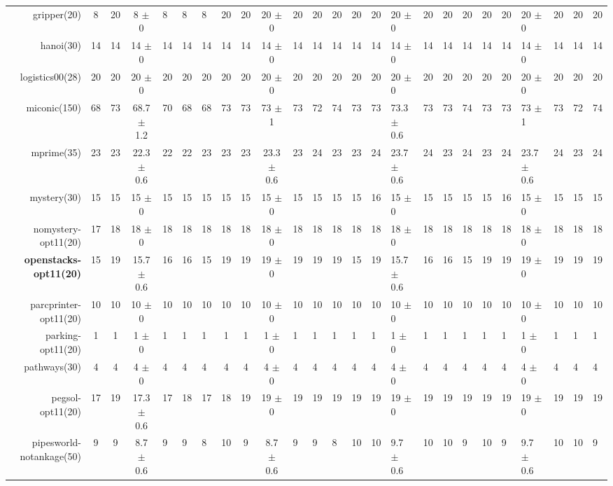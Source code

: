 \begin{center}
\begin{tabular}{|r|cccHHH|cccHHHHHHHHHHHHHHH|}
gripper(20) & 8 & 20 & 8 $\pm$ 0 & 8 & 8 & 8 & 20 & 20 & 20 $\pm$ 0 & 20 & 20 & 20 & 20 & 20 & 20 $\pm$ 0 & 20 & 20 & 20 & 20 & 20 & 20 $\pm$ 0 & 20 & 20 & 20\\
hanoi(30) & 14 & 14 & 14 $\pm$ 0 & 14 & 14 & 14 & 14 & 14 & 14 $\pm$ 0 & 14 & 14 & 14 & 14 & 14 & 14 $\pm$ 0 & 14 & 14 & 14 & 14 & 14 & 14 $\pm$ 0 & 14 & 14 & 14\\
logistics00(28) & 20 & 20 & 20 $\pm$ 0 & 20 & 20 & 20 & 20 & 20 & 20 $\pm$ 0 & 20 & 20 & 20 & 20 & 20 & 20 $\pm$ 0 & 20 & 20 & 20 & 20 & 20 & 20 $\pm$ 0 & 20 & 20 & 20\\
miconic(150) & 68 & 73 & 68.7 $\pm$ 1.2 & 70 & 68 & 68 & 73 & 73 & 73 $\pm$ 1 & 73 & 72 & 74 & 73 & 73 & 73.3 $\pm$ 0.6 & 73 & 73 & 74 & 73 & 73 & 73 $\pm$ 1 & 73 & 72 & 74\\
mprime(35) & 23 & 23 & 22.3 $\pm$ 0.6 & 22 & 22 & 23 & 23 & 23 & 23.3 $\pm$ 0.6 & 23 & 24 & 23 & 23 & 24 & 23.7 $\pm$ 0.6 & 24 & 23 & 24 & 23 & 24 & 23.7 $\pm$ 0.6 & 24 & 23 & 24\\
mystery(30) & 15 & 15 & 15 $\pm$ 0 & 15 & 15 & 15 & 15 & 15 & 15 $\pm$ 0 & 15 & 15 & 15 & 15 & 16 & 15 $\pm$ 0 & 15 & 15 & 15 & 15 & 16 & 15 $\pm$ 0 & 15 & 15 & 15\\
nomystery-opt11(20) & 17 & 18 & 18 $\pm$ 0 & 18 & 18 & 18 & 18 & 18 & 18 $\pm$ 0 & 18 & 18 & 18 & 18 & 18 & 18 $\pm$ 0 & 18 & 18 & 18 & 18 & 18 & 18 $\pm$ 0 & 18 & 18 & 18\\
\textbf{openstacks-opt11(20)} & 15 & 19 & 15.7 $\pm$ 0.6 & 16 & 16 & 15 & 19 & 19 & 19 $\pm$ 0 & 19 & 19 & 19 & 15 & 19 & 15.7 $\pm$ 0.6 & 16 & 16 & 15 & 19 & 19 & 19 $\pm$ 0 & 19 & 19 & 19\\
parcprinter-opt11(20) & 10 & 10 & 10 $\pm$ 0 & 10 & 10 & 10 & 10 & 10 & 10 $\pm$ 0 & 10 & 10 & 10 & 10 & 10 & 10 $\pm$ 0 & 10 & 10 & 10 & 10 & 10 & 10 $\pm$ 0 & 10 & 10 & 10\\
parking-opt11(20) & 1 & 1 & 1 $\pm$ 0 & 1 & 1 & 1 & 1 & 1 & 1 $\pm$ 0 & 1 & 1 & 1 & 1 & 1 & 1 $\pm$ 0 & 1 & 1 & 1 & 1 & 1 & 1 $\pm$ 0 & 1 & 1 & 1\\
pathways(30) & 4 & 4 & 4 $\pm$ 0 & 4 & 4 & 4 & 4 & 4 & 4 $\pm$ 0 & 4 & 4 & 4 & 4 & 4 & 4 $\pm$ 0 & 4 & 4 & 4 & 4 & 4 & 4 $\pm$ 0 & 4 & 4 & 4\\
pegsol-opt11(20) & 17 & 19 & 17.3 $\pm$ 0.6 & 17 & 18 & 17 & 18 & 19 & 19 $\pm$ 0 & 19 & 19 & 19 & 19 & 19 & 19 $\pm$ 0 & 19 & 19 & 19 & 19 & 19 & 19 $\pm$ 0 & 19 & 19 & 19\\
pipesworld-notankage(50) & 9 & 9 & 8.7 $\pm$ 0.6 & 9 & 9 & 8 & 10 & 9 & 8.7 $\pm$ 0.6 & 9 & 9 & 8 & 10 & 10 & 9.7 $\pm$ 0.6 & 10 & 10 & 9 & 10 & 9 & 9.7 $\pm$ 0.6 & 10 & 10 & 9\\

\end{tabular}
\end{center}

